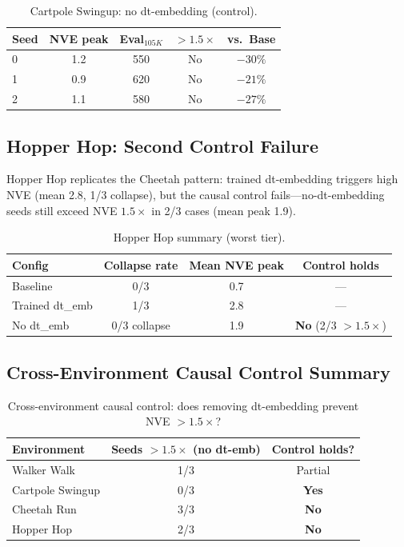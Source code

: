 \documentclass[10pt,twocolumn]{article}
\begin{document}
\begin{table}[h]
\centering
\caption{Cartpole Swingup: no dt-embedding (control).}
\label{tab:cartpole-control}
\begin{tabular}{lcccc}
\toprule
Seed & NVE peak & Eval$_{105K}$ & $>1.5\times$ & vs.\ Base \\
\midrule
0 & 1.2 & 550 & No & $-30\%$ \\
1 & 0.9 & 620 & No & $-21\%$ \\
2 & 1.1 & 580 & No & $-27\%$ \\
\bottomrule
\end{tabular}
\end{table}

\subsection{Hopper Hop: Second Control Failure}
\label{sec:hopper}

Hopper Hop replicates the Cheetah pattern: trained dt-embedding triggers high NVE (mean 2.8, 1/3 collapse), but the causal control fails---no-dt-embedding seeds still exceed NVE $1.5\times$ in 2/3 cases (mean peak 1.9).

\begin{table}[h]
\centering
\caption{Hopper Hop summary (worst tier).}
\label{tab:hopper}
\begin{tabular}{lccc}
\toprule
Config & Collapse rate & Mean NVE peak & Control holds \\
\midrule
Baseline & 0/3 & 0.7 & --- \\
Trained dt\_emb & 1/3 & 2.8 & --- \\
No dt\_emb & 0/3 collapse & 1.9 & \textbf{No} (2/3 $>1.5\times$) \\
\bottomrule
\end{tabular}
\end{table}

\subsection{Cross-Environment Causal Control Summary}

\begin{table}[h]
\centering
\caption{Cross-environment causal control: does removing dt-embedding prevent NVE $>1.5\times$?}
\label{tab:cross-env-control}
\begin{tabular}{lcc}
\toprule
Environment & Seeds $>1.5\times$ (no dt-emb) & Control holds? \\
\midrule
Walker Walk & 1/3 & Partial \\
Cartpole Swingup & 0/3 & \textbf{Yes} \\
Cheetah Run & 3/3 & \textbf{No} \\
Hopper Hop & 2/3 & \textbf{No} \\
\bottomrule
\end{tabular}
\end{table}
\end{document}

